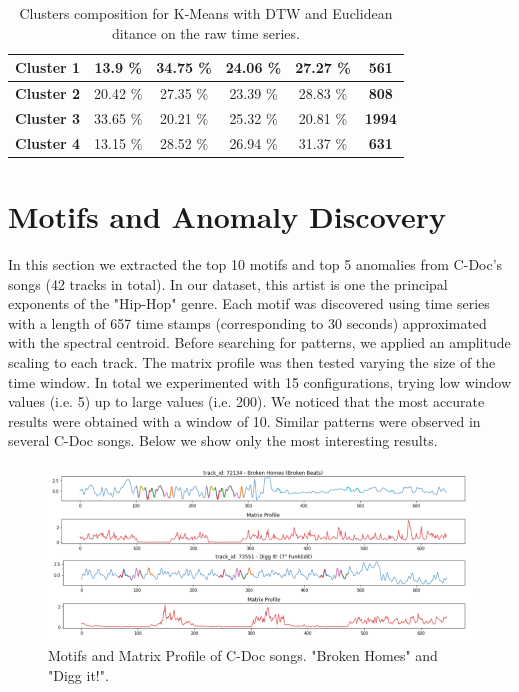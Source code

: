 \begin{table}[htb]
\begin{tabular}{cccccc}
\textbf{Cluster 1} & 13.9 \%                          & 34.75 \%                         & \cellcolor[HTML]{FFFFFF}24.06 \% & 27.27 \%                         & \textbf{561}              \\ \hline
\textbf{Cluster 2} & 20.42 \%                         & 27.35 \%                         & 23.39 \%                         & \cellcolor[HTML]{FFFFFF}28.83 \% & \textbf{808}              \\ \hline
\textbf{Cluster 3} & \cellcolor[HTML]{FFFFFF}33.65 \% & 20.21 \%                         & 25.32 \%                         & 20.81 \%                         & \textbf{1994}             \\ \hline
\textbf{Cluster 4} & 13.15 \%                         & \cellcolor[HTML]{FFFFFF}28.52 \% & 26.94 \%                         & 31.37 \%                         & \textbf{631}              \\ \hline
\end{tabular}
 \caption{Clusters composition for K-Means with DTW and Euclidean ditance on the raw time series.}
\end{table}
\newpage
\section{Motifs and Anomaly Discovery}
In this section we extracted the top 10 motifs and top 5 anomalies from C-Doc's songs (42 tracks in total). In our dataset, this artist is one the principal exponents of the "Hip-Hop" genre.
Each motif was discovered using time series with a length of 657 time stamps (corresponding to 30 seconds) approximated with the spectral centroid. Before searching for patterns, we applied an amplitude scaling to each track. The matrix profile was then tested varying the size of the time window. In total we experimented with 15 configurations, trying low window values (i.e. 5) up to large values (i.e. 200). We noticed that the most accurate results were obtained with a window of 10. Similar patterns were observed in several C-Doc songs. Below we show only the most interesting results. 

\begin{figure}[!htb]
  \centering
  \includegraphics[width=0.9\linewidth]{images/CDOC-Motifs-MP.png}
  \caption{Motifs and Matrix Profile of C-Doc songs. "Broken Homes" and "Digg it!".}
\end{figure}

